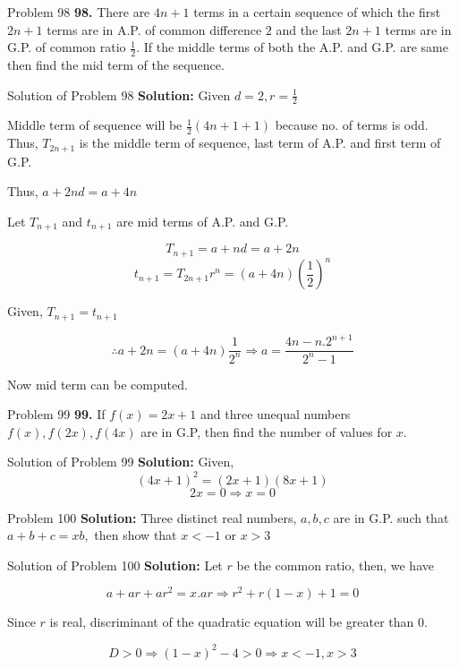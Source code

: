 \documentclass[aspectratio=1610,8pt]{beamer}
\begin{document}
\begin{frame}{Problem 98}
  \textbf{98.} There are $4n + 1$ terms in a certain sequence of which the first $2n + 1$ terms are in A.P. of common difference
  $2$ and the last $2n + 1$ terms are in G.P. of common ratio $\frac{1}{2}.$ If the middle terms of both the A.P. and G.P. are same
  then find the mid term of the sequence.
\end{frame}
\begin{frame}{Solution of Problem 98}
  \textbf{Solution:} Given $d = 2, r = \frac{1}{2}$

  Middle term of sequence will be $\frac{1}{2}(4n + 1 + 1)$ because no. of terms is odd. Thus, $T_{2n + 1}$ is the middle term of
  sequence, last term of A.P. and first term of G.P.

  Thus, $a + 2nd = a + 4n$

  Let $T_{n + 1}$ and $t_{n + 1}$ are mid terms of A.P. and G.P.

  $$T_{n + 1} = a + nd = a + 2n$$
  $$t_{n + 1} = T_{2n + 1}r^n = (a + 4n)\left(\frac{1}{2}\right)^n$$

  Given, $T_{n + 1} = t_{n + 1}$

  $$\therefore a + 2n = (a + 4n)\frac{1}{2^n} \Rightarrow a = \frac{4n - n.2^{n + 1}}{2^n - 1}$$

  Now mid term can be computed.
\end{frame}
\begin{frame}{Problem 99}
  \textbf{99.} If $f(x) = 2x + 1$ and three unequal numbers $f(x), f(2x), f(4x)$ are in G.P, then find the number of values for
  $x.$
\end{frame}
\begin{frame}{Solution of Problem 99}
  \textbf{Solution:} Given, $$(4x + 1)^2 = (2x + 1)(8x + 1)$$
  $$2x = 0 \Rightarrow x = 0$$
\end{frame}
\begin{frame}{Problem 100}
  \textbf{Solution:} Three distinct real numbers, $a, b, c$ are in G.P. such that $a + b + c = xb,$ then show that $x < -1$ or $x >
  3$
\end{frame}
\begin{frame}{Solution of Problem 100}
  \textbf{Solution:} Let $r$ be the common ratio, then, we have

  $$a + ar + ar^2 = x.ar \Rightarrow r^2 + r(1 - x) + 1 = 0$$

  Since $r$ is real, discriminant of the quadratic equation will be greater than $0.$

  $$D > 0 \Rightarrow (1 - x)^2 - 4> 0 \Rightarrow x < -1, x > 3$$
\end{frame}
\end{document}
